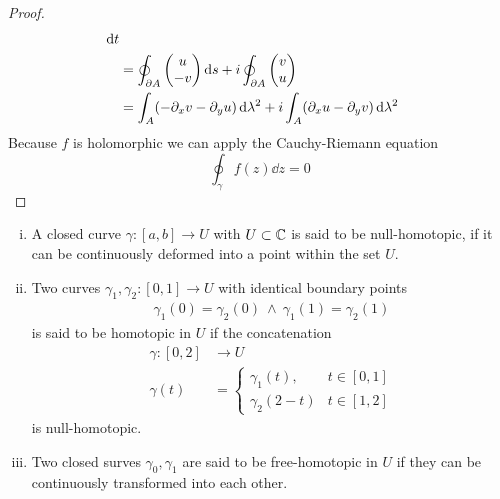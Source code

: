 \documentclass[../../script.tex]{subfiles}
\begin{document}
\begin{proof}
\begin{equation}
\begin{split}
            \dd{t} \\
            &= \oint_{\partial A} \begin{pmatrix}
                u \\ -v
            \end{pmatrix} \dd{s} + i \oint_{\partial A} \begin{pmatrix}
                v \\ u
            \end{pmatrix} \\
            &= \int_A (-\partial_x v - \partial_y u) \dd{\lambda^2} + i \int_A (\partial_x u - \partial_y v) \dd{\lambda^2} \\
        \end{split}
    \end{equation}
    Because $f$ is holomorphic we can apply the Cauchy-Riemann equation 
    \begin{equation}
        \oint_{\gamma} f(z) \dd{z} = 0
    \end{equation}
\end{proof}

\begin{defi}
    \begin{enumerate}[(i)]
        \item A closed curve $\gamma: [a, b] \rightarrow U$ with $U \subset \mathbb{C}$ is said to be null-homotopic,  
        if it can be continuously deformed into a point within the set $U$.

        \item Two curves $\gamma_1, \gamma_2: [0, 1] \rightarrow U$ with identical boundary points
        \begin{align*}
            \gamma_1(0) = \gamma_2(0) ~\wedge~ \gamma_1(1) = \gamma_2(1)
        \end{align*}
        is said to be homotopic in $U$ if the concatenation
        \begin{align*}
            \gamma: [0, 2] &\longrightarrow U \\
            \gamma(t) &= \begin{cases}
                \gamma_1(t), & t \in [0, 1] \\
                \gamma_2(2 - t) & t \in [1, 2]
            \end{cases}
        \end{align*}
        is null-homotopic.

        \item Two closed surves $\gamma_0, \gamma_1$ are said to be free-homotopic in $U$ if they can be continuously transformed into each other.
    \end{enumerate}
\end{defi}
\end{document}
